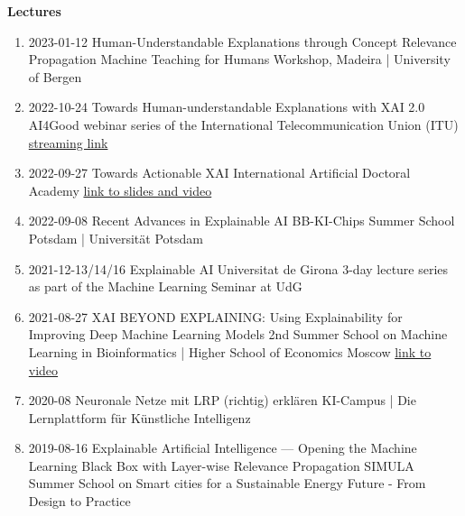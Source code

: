 \headedsection
{\bf Lectures}{}
{
\begin{enumerate}
    \item {}
                    {2023-01-12}
                    {Human-Understandable Explanations through Concept Relevance Propagation}
                    {Machine Teaching for Humans Workshop, Madeira | University of Bergen}
    \item {}
                    {2022-10-24}
                    {Towards Human-understandable Explanations with XAI 2.0}
                    {AI4Good webinar series of the International Telecommunication Union (ITU)}
                    {\href{https://www.youtube.com/watch?v=NiE13aBBx28}{streaming link}}
    \item {}
                    {2022-09-27}
                    {Towards Actionable XAI}
                    {International Artificial Doctoral Academy}
                    {\href{https://www.i-aida.org/events/towards-actionable-xai-2/}{link to slides and video}}
    \item {}
                    {2022-09-08}
                    {Recent Advances in Explainable AI}
                    {BB-KI-Chips Summer School Potsdam | Universität Potsdam}
    \item {}
                    {2021-12-13/14/16}
                    {Explainable AI}
                    {Universitat de Girona}
                    {3-day lecture series as part of the Machine Learning Seminar at UdG}
    \item {}
                    {2021-08-27}
                    {XAI BEYOND EXPLAINING: Using Explainability for Improving Deep Machine Learning Models}
                    {2nd Summer School on Machine Learning in Bioinformatics | Higher School of Economics Moscow}
                    {\href{https://www.youtube.com/watch?v=fHBSLzJ4zbA}{link to video}}
    \item {}
                    {2020-08}
                    {Neuronale Netze mit LRP (richtig) erklären}
                    {KI-Campus | Die Lernplattform für Künstliche Intelligenz}
    \item {}
                    {2019-08-16}
                    {Explainable Artificial Intelligence --- Opening the Machine Learning Black Box with Layer-wise Relevance Propagation}
                    {SIMULA Summer School on Smart cities for a Sustainable Energy Future - From Design to Practice}
\end{enumerate}
}